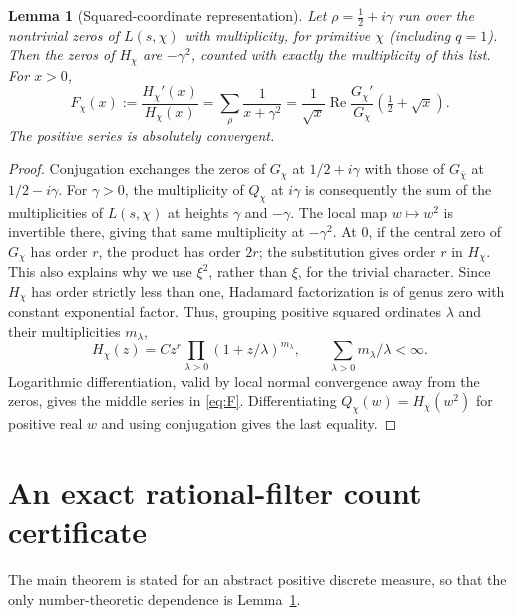 \documentclass[11pt]{article}
\newtheorem{lemma}[theorem]{Lemma}
\theoremstyle{remark}\newtheorem{remark}[theorem]{Remark}
\newcommand{\Rea}{\operatorname{Re}}
\begin{document}
\begin{lemma}[Squared-coordinate representation]\label{lem:stieltjes}
Let $\rho=\tfrac12+i\gamma$ run over the nontrivial zeros of $L(s,\chi)$ with multiplicity, for primitive $\chi$ (including $q=1$). Then the zeros of $H_\chi$ are $-\gamma^2$, counted with exactly the multiplicity of this list. For $x>0$,
\begin{equation}\label{eq:F}
 F_\chi(x):=\frac{H_\chi'(x)}{H_\chi(x)}
 =\sum_{\rho}\frac{1}{x+\gamma^2}
 =\frac{1}{\sqrt{x}}\Rea\frac{G_\chi'}{G_\chi}\left(\tfrac12+\sqrt{x}\right).
\end{equation}
The positive series is absolutely convergent.
\end{lemma}
\begin{proof}
Conjugation exchanges the zeros of $G_\chi$ at $1/2+i\gamma$ with those of $G_{\bar\chi}$ at $1/2-i\gamma$. For $\gamma>0$, the multiplicity of $Q_\chi$ at $i\gamma$ is consequently the sum of the multiplicities of $L(s,\chi)$ at heights $\gamma$ and $-\gamma$. The local map $w\mapsto w^2$ is invertible there, giving that same multiplicity at $-\gamma^2$. At $0$, if the central zero of $G_\chi$ has order $r$, the product has order $2r$; the substitution gives order $r$ in $H_\chi$. This also explains why we use $\xi^2$, rather than $\xi$, for the trivial character. Since $H_\chi$ has order strictly less than one, Hadamard factorization is of genus zero with constant exponential factor. Thus, grouping positive squared ordinates $\lambda$ and their multiplicities $m_\lambda$,
\[
 H_\chi(z)=C z^r\prod_{\lambda>0}(1+z/\lambda)^{m_\lambda},
 \qquad \sum_{\lambda>0}m_\lambda/\lambda<\infty.
\]
Logarithmic differentiation, valid by local normal convergence away from the zeros, gives the middle series in \eqref{eq:F}. Differentiating $Q_\chi(w)=H_\chi(w^2)$ for positive real $w$ and using conjugation gives the last equality.
\end{proof}

\section{An exact rational-filter count certificate}
The main theorem is stated for an abstract positive discrete measure, so that the only number-theoretic dependence is Lemma~\ref{lem:stieltjes}.
\end{document}
